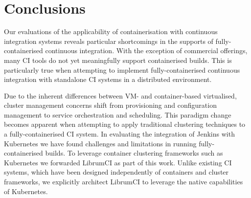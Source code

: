 \documentclass[journal]{IEEEtran}
\begin{document}
\section{Conclusions}
Our evaluations of the applicability of containerisation with continuous integration systems reveals 
particular shortcomings in the supports of fully-containerised continuous integration.
With the exception of commercial offerings, many CI tools do not yet meaningfully 
support containerised builds. This is particularly true when attempting to
implement fully-containerised continuous integration with standalone CI systems
in a distributed environment. 
\par
Due to the inherent differences between VM- and container-based virtualised,
cluster management concerns shift from provisioning and configuration management
to service orchestration and scheduling. This paradigm change becomes apparent 
when attempting to apply traditional clustering techniques to a fully-containerised CI system.
In evaluating the integration of Jenkins with Kubernetes we have found
challenges and limitations in running fully-containerised builds. To leverage 
container clustering frameworks such as Kubernetes we forwarded LibrumCI as part of this work.
Unlike existing CI systems, which have been designed independently of containers and cluster frameworks,
we explicitly architect LibrumCI to leverage the native capabilities of Kubernetes.




\end{document}

